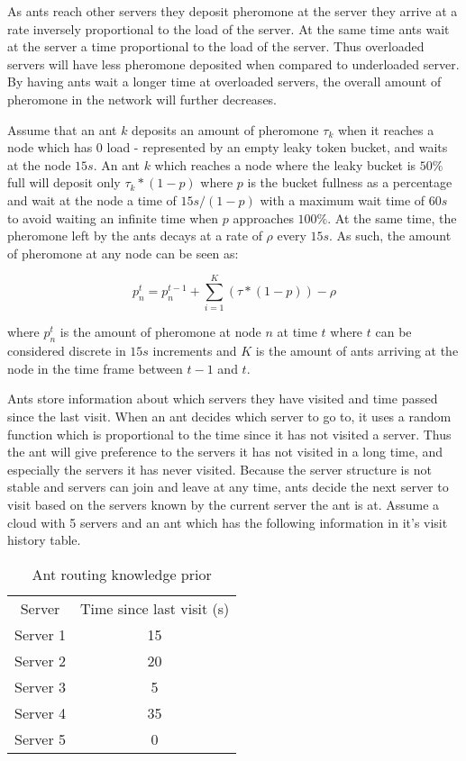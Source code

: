 \documentclass{sig-alternate}
\begin{document}
As ants reach other servers they deposit pheromone at the server they arrive at a rate inversely proportional to the load of the server. At the same time ants wait at the server a time proportional to the load of the server. Thus overloaded servers will have less pheromone deposited when compared to underloaded server. By having ants wait a longer time at overloaded servers, the overall amount of pheromone in the network will further decreases. 

Assume that an ant $k$ deposits an amount of pheromone $\tau_{k}$ when it reaches a node which has 0 load - represented by an empty leaky token bucket, and waits at the node $15s$. An ant $k$ which reaches a node where the leaky bucket is $50\%$ full will deposit only $\tau_{k} * (1 - p)$ where $p$ is the bucket fullness as a percentage and wait at the node a time of $15s/(1-p)$ with a maximum wait time of $60s$ to avoid waiting an infinite time when $p$ approaches $100\%$. At the same time, the pheromone left by the ants decays at a rate of $\rho$ every $15s$. As such, the amount of pheromone at any node can be seen as:

\begin{equation}
p^{t}_{n} = p^{t-1}_{n} + \sum_{i=1}^{K}(\tau * (1 - p)) - \rho
\end{equation}

where $p^{t}_{n}$ is the amount of pheromone at node $n$ at time $t$ where $t$ can be considered discrete in $15s$ increments and $K$ is the amount of ants arriving at the node in the time frame between $t-1$ and $t$.

Ants store information about which servers they have visited and time passed since the last visit. When an ant decides which server to go to, it uses a random function which is proportional to the time since it has not visited a server. Thus the ant will give preference to the servers it has not visited in a long time, and especially the servers it has never visited. Because the server structure is not stable and servers can join and leave at any time, ants decide the next server to visit based on the servers known by the current server the ant is at.  Assume a cloud with 5 servers and an ant which has the following information in it's visit history table. 

\begin{table}[]
\centering
\begin{tabular}{c|c}
Server & Time since last visit (s) \\
Server 1 & 15 \\
Server 2 & 20 \\
Server 3 & 5 \\
Server 4 & 35 \\
Server 5 & 0 \\
\end{tabular}
\caption{Ant routing knowledge prior}
\label{tab:ant_prio}
\end{table}
\end{document}
